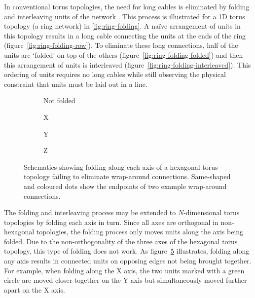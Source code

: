		In conventional torus topologies, the need for long cables is eliminated by
		folding and interleaving units of the network \cite{dally04}. This process
		is illustrated for a 1D torus topology (a ring network) in
		\ref{fig:ring-folding}. A na\"ive arrangement of units in this topology
		results in a long cable connecting the units at the ends of the ring
		(figure~\ref{fig:ring-folding-row}).  To eliminate these long connections,
		half of the units are `folded' on top of the others
		(figure~\ref{fig:ring-folding-folded}) and then this arrangement of units
		is interleaved (figure~\ref{fig:ring-folding-interleaved}). This ordering
		of units requires no long cables while still observing the physical
		constraint that units must be laid out in a line.
		
		\begin{figure}
			\center
			\begin{subfigure}[b]{0.24\linewidth}
				\center
				\caption{Not folded}
				\label{fig:failing-to-fold-hex-toruses-none}
			\end{subfigure}
			\begin{subfigure}[b]{0.24\linewidth}
				\center
				\caption{X}
				\label{fig:failing-to-fold-hex-toruses-x}
			\end{subfigure}
			\begin{subfigure}[b]{0.24\linewidth}
				\center
				\caption{Y}
				\label{fig:failing-to-fold-hex-toruses-y}
			\end{subfigure}
			\begin{subfigure}[b]{0.24\linewidth}
				\center
				\caption{Z}
				\label{fig:failing-to-fold-hex-toruses-z}
			\end{subfigure}
			
			\caption{Schematics showing folding along each axis of a hexagonal
			torus topology failing to eliminate wrap-around connections.  Same-shaped
			and coloured dots show the endpoints of two example wrap-around
			connections.}
			\label{fig:failing-to-fold-hex-toruses}
		\end{figure}
		
		The folding and interleaving process may be extended to $N$-dimensional
		torus topologies by folding each axis in turn. Since all axes are
		orthogonal in non-hexagonal topologies, the folding process only moves
		units along the axis being folded. Due to the non-orthogonality of the
		three axes of the hexagonal torus topology, this type of folding does not
		work. As figure~\ref{fig:failing-to-fold-hex-toruses} illustrates, folding
		along any axis results in connected units on opposing edges not being
		brought together. For example, when folding along the X axis, the two units
		marked with a green circle are moved closer together on the Y axis but
		simultaneously moved further apart on the X axis.
	
